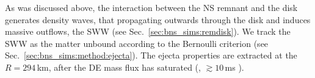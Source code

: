 %    



As was discussed above, the interaction between the \ac{NS} remnant and the disk 
generates density waves, that propagating outwards through the disk and induces massive outflows, the \ac{SWW} (see Sec.~\ref{sec:bns_sims:remdisk}).
%
We track the \ac{SWW} as the matter unbound according to the Bernoulli criterion 
(see Sec.~\ref{sec:bns_sims:method:ejecta}). 
%
The ejecta properties are extracted at the $R=294\,$km, after the \ac{DE} mass 
flux has saturated (\eg, ${\gtrsim}10\,$ms \pmerg{}).
%
%


